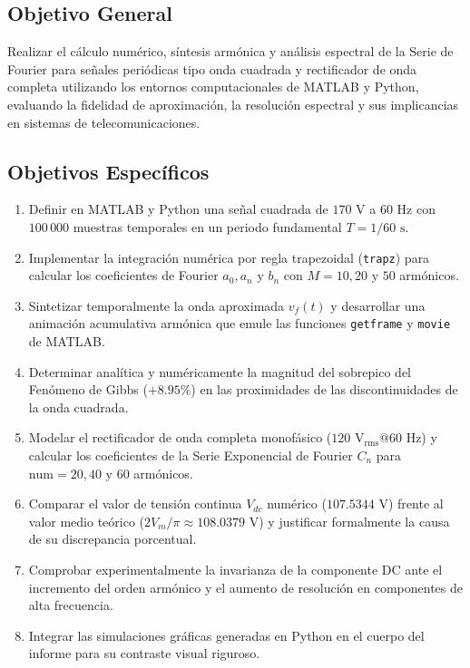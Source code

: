 \documentclass[11pt,a4paper]{article}
\begin{document}
\subsection{Objetivo General}
Realizar el cálculo numérico, síntesis armónica y análisis espectral de la Serie de Fourier para señales periódicas tipo onda cuadrada y rectificador de onda completa utilizando los entornos computacionales de MATLAB y Python, evaluando la fidelidad de aproximación, la resolución espectral y sus implicancias en sistemas de telecomunicaciones.

\subsection{Objetivos Específicos}
\begin{enumerate}[leftmargin=*]
    \item Definir en MATLAB y Python una señal cuadrada de $170\text{ V}$ a $60\text{ Hz}$ con $100\,000$ muestras temporales en un periodo fundamental $T = 1/60\text{ s}$.
    \item Implementar la integración numérica por regla trapezoidal (\texttt{trapz}) para calcular los coeficientes de Fourier $a_0, a_n \text{ y } b_n$ con $M = 10, 20 \text{ y } 50$ armónicos.
    \item Sintetizar temporalmente la onda aproximada $v_f(t)$ y desarrollar una animación acumulativa armónica que emule las funciones \texttt{getframe} y \texttt{movie} de MATLAB.
    \item Determinar analítica y numéricamente la magnitud del sobrepico del Fenómeno de Gibbs ($+8.95\%$) en las proximidades de las discontinuidades de la onda cuadrada.
    \item Modelar el rectificador de onda completa monofásico ($120\text{ V}_{\text{rms}} @ 60\text{ Hz}$) y calcular los coeficientes de la Serie Exponencial de Fourier $C_n$ para $\text{num} = 20, 40 \text{ y } 60$ armónicos.
    \item Comparar el valor de tensión continua $V_{dc}$ numérico ($107.5344\text{ V}$) frente al valor medio teórico ($2V_m/\pi \approx 108.0379\text{ V}$) y justificar formalmente la causa de su discrepancia porcentual.
    \item Comprobar experimentalmente la invarianza de la componente DC ante el incremento del orden armónico y el aumento de resolución en componentes de alta frecuencia.
    \item Integrar las simulaciones gráficas generadas en Python en el cuerpo del informe para su contraste visual riguroso.
\end{enumerate}
\end{document}
